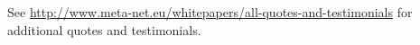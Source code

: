 \documentclass[10pt, plain]{../../metanetpaper}
\begin{document}
\bigskip \centerline{See \url{http://www.meta-net.eu/whitepapers/all-quotes-and-testimonials} for additional quotes and testimonials.}

\clearpage



\renewcommand\contentsname{}
\tableofcontents


\clearpage


\setcounter{page}{1}
\pagestyle{scrheadings}

\clearpage

%

\end{document}
